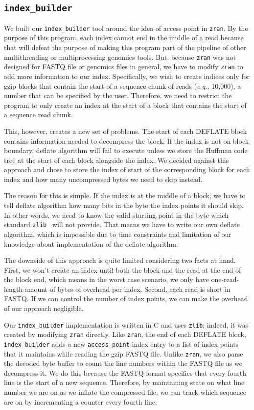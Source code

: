 \documentclass[unnumsec,webpdf,contemporary,large]{oup-authoring-template}
\newcommand{\zlib}{\texttt{zlib}\xspace}
\newcommand{\zran}{\texttt{zran}\xspace}
\newcommand{\ibuilder}{\texttt{index\_builder}\xspace}
\newcommand{\gzip}{gzip\xspace}
\newcommand{\eg}{\emph{e.g.,}\xspace}
\begin{document}
\subsection{\ibuilder}
\label{sec:ibuilder}
We built our \ibuilder tool around the idea of access point in \zran. By the
purpose of this program, each index cannot end in the middle of a read because
that will defeat the purpose of making this program part of the pipeline of
other multithreading or multiprocessing genomics tools. But, because \zran was
not designed for FASTQ file or genomics files in general, we have to modify
\zran to add more information to our index. Specifically, we wish to create
indices only for \gzip blocks that contain the start of a sequence chunk of
reads (\eg 10,000), a number that can be specified by the user. Therefore, we
need to restrict the program to only create an index at the start of a block
that contains the start of a sequence read chunk.

This, however, creates a new set of problems. The start of each DEFLATE block
contains information needed to decompress the block. If the index is not on
block boundary, deflate algorithm will fail to execute unless we store the
Huffman code tree at the start of each block alongside the index. We decided
against this approach and chose to store the index of start of the corresponding
block for each index and how many uncompressed bytes we need to skip instead. 

The reason for this is simple. If the index is at the middle of a block, we have to tell deflate algorithm how many bits in the byte the index points it should skip. In other words, we need to know the valid starting point in the byte which standard \zlib~\cite{zlib} will not provide. That means we have to write our own deflate algorithm, which is impossible due to time constraints and limitation of our knowledge about implementation of the deflate algorithm. 

The downside of this approach is quite limited considering two facts at hand.
First, we won't create an index until both the block and the read at the end of
the block end, which means in the worst case scenario, we only have
one-read-length amount of bytes of overhead per index. Second, each read is
short in FASTQ. If we can control the number of index points, we can make the
overhead of our approach negligible.  

Our \ibuilder implementation is written in C and uses \zlib; indeed, it was
created by modifying \zran directly. Like \zran, the end of each DEFLATE block,
\ibuilder adds a new \texttt{access\_point} index entry to a list of index
points that it maintains while reading the \gzip FASTQ file. Unlike \zran, we
also parse the decoded byte buffer to count the line numbers within the FASTQ
file as we decompress it. We do this because the FASTQ format specifies that
every fourth line is the start of a new sequence. Therefore, by maintaining
state on what line number we are on as we inflate the compressed file, we can
track which sequence are on by incrementing a counter every fourth line. 
\end{document}
